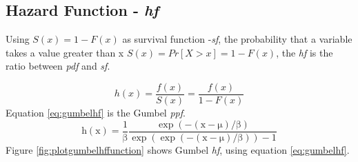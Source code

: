 \documentclass[12pt,oneside]{reedthesis}
\begin{document}
\hypertarget{hazard-function---hf}{%
\subsection{\texorpdfstring{Hazard Function - \emph{hf}}{Hazard Function - hf}}\label{hazard-function---hf}}

Using \(S(x) = 1 - F(x)\) as survival function -\emph{sf}, the probability that a variable takes a value greater than x \(S(x) = Pr[X > x] = 1 - F(x)\), the \emph{hf} is the ratio between \emph{pdf} and \emph{sf}.

\[
h(x) = \frac{f(x)}{S(x)} = \frac{f(x)}{1-F(x)}
\]
Equation \eqref{eq:gumbelhf} is the Gumbel \emph{ppf}.
\begin{equation}
\mathrm{
        h(x)= \frac{1}{\beta}\frac{\exp(-(x-\mu)/\beta)}{\exp(\exp(-(x-\mu)/\beta))-1}
       }
  \label{eq:gumbelhf}
\end{equation}
Figure \ref{fig:plotgumbelhffunction} shows Gumbel \emph{hf}, using equation \eqref{eq:gumbelhf}.
\end{document}
